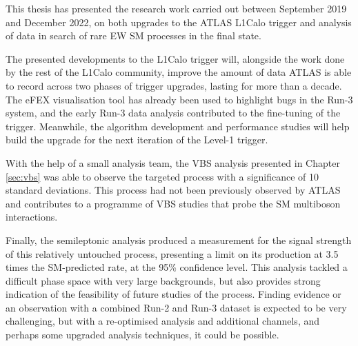 This thesis has presented the research work carried out between September 2019 and
December 2022, on both upgrades to the \ac{ATLAS} \ac{L1Calo} trigger and
analysis of data in search of rare \ac{EW} \ac{SM} processes in the \Zyjj final
state.

The presented developments to the \ac{L1Calo} trigger will, alongside the work
done by the rest of the \ac{L1Calo} community, improve the amount of data
\ac{ATLAS} is able to record across two phases of trigger upgrades, 
lasting for more than a decade. The \ac{eFEX} visualisation tool has already
been used to highlight bugs in the Run-3 system, and the early Run-3 data
analysis contributed to the fine-tuning of the \egamma trigger. Meanwhile, the
\eratio algorithm development and performance studies will help build the
upgrade for the next iteration of the Level-1 trigger.

With the help of a small analysis team, the \ac{VBS} \Zy analysis presented in
Chapter \ref{sec:vbs} was able to observe the targeted process with a
significance of 10 standard deviations. This process had not been previously
observed by \ac{ATLAS} and contributes to a programme of \ac{VBS} studies that
probe the \ac{SM} multiboson interactions.

Finally, the semileptonic \VZy analysis produced a measurement for the signal
strength of this relatively untouched process, presenting a limit on its
production at 3.5 times the \ac{SM}-predicted rate, at the 95\% confidence
level. This analysis tackled a difficult phase space with very large
backgrounds, but also provides strong indication of the feasibility of future
studies of the process. Finding evidence or an observation with a combined Run-2
and Run-3 dataset is expected to be very challenging, but with a re-optimised
analysis and additional channels, and perhaps some upgraded analysis techniques,
it could be possible.
